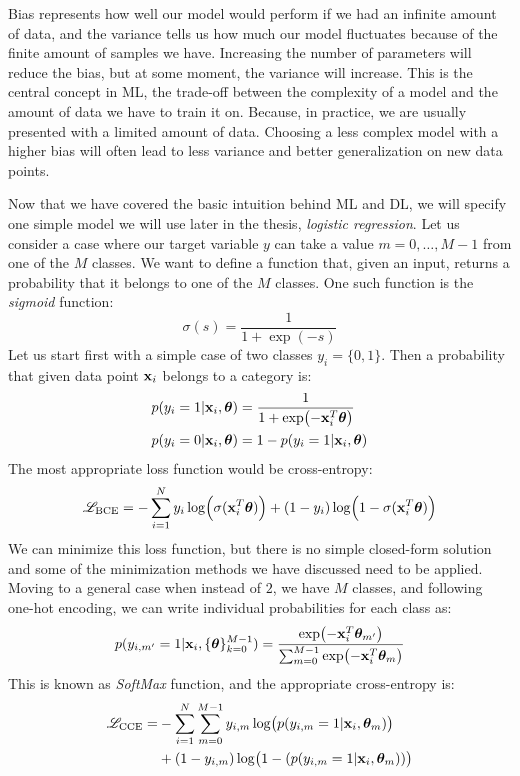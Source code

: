 Bias represents how well our model would perform if we had an infinite amount of data, and the variance tells us how much our model fluctuates because of the finite amount of samples we have. Increasing the number of parameters will reduce the bias, but at some moment, the variance will increase. This is the central concept in ML, the trade-off between the complexity of a model and the amount of data we have to train it on. Because, in practice, we are usually presented with a limited amount of data. Choosing a less complex model with a higher bias will often lead to less variance and better generalization on new data points.
\par
Now that we have covered the basic intuition behind ML and DL, we will specify one simple model we will use later in the thesis, \textit{logistic regression}. Let us consider a case where our target variable $y$ can take a value $m = 0, \dots, M-1$ from one of the $M$ classes. We want to define a function that, given an input, returns a probability that it belongs to one of the $M$ classes. One such function is the \textit{sigmoid} function:
\begin{equation}
	\sigma(s) = \frac{1}{1 + \exp(-s)}
\end{equation}
Let us start first with a simple case of two classes $y_i = \{0, 1\}$. Then a probability that given data point $\vb{x}_i$ belongs to a category is:
\begin{align}
	p(y_i=1 | \vb{x}_i, \boldsymbol{\theta}) &= \frac{1}{1 + \exp(-\vb{x}_i^T \boldsymbol{\theta})} \\
	p(y_i=0 | \vb{x}_i, \boldsymbol{\theta}) &= 1 - p(y_i=1 | \vb{x}_i, \boldsymbol{\theta})
\end{align}
The most appropriate loss function would be cross-entropy:
\begin{equation}
	\mathcal{L}_{\text{BCE}} = -\sum_{i=1}^N y_i\log(\sigma(\vb{x}_i^T \boldsymbol{\theta})) + (1-y_i)\log(1-\sigma(\vb{x}_i^T \boldsymbol{\theta}))
\end{equation}
We can minimize this loss function, but there is no simple closed-form solution and some of the minimization methods we have discussed need to be applied. Moving to a general case when instead of $2$, we have $M$ classes, and following one-hot encoding, we can write individual probabilities for each class as:
\begin{equation}
	p(y_{i,m'}=1|\vb{x}_i, \{\boldsymbol{\theta}\}_{k=0}^{M-1}) = \frac{\exp(-\vb{x}_i^T \boldsymbol{\theta}_{m'})}{\sum_{m=0}^{M-1}\exp(-\vb{x}_i^T \boldsymbol{\theta}_m)}
\end{equation}
This is known as \textit{SoftMax} function, and the appropriate cross-entropy is:
\begin{align}
	\mathcal{L}_{\text{CCE}} = &-\sum_{i=1}^N \sum_{m=0}^{M-1} y_{i,m} \log(p(y_{i,m}=1|\vb{x}_i, \boldsymbol{\theta}_m)) \nonumber \\ &+ (1-y_{i,m})\log(1 - (p(y_{i,m}=1|\vb{x}_i, \boldsymbol{\theta}_m)))
\end{align}
